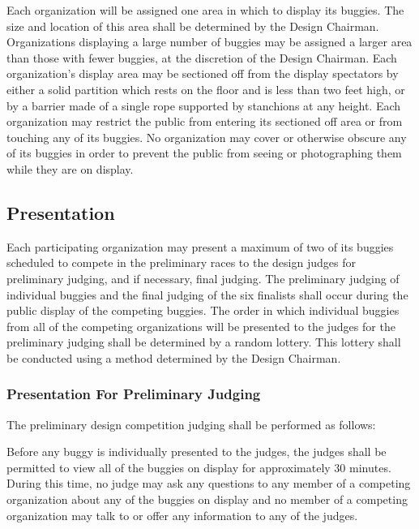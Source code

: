	Each organization will be assigned one area in which to display its buggies. The size and location of this area shall be determined by the Design Chairman. Organizations displaying a large number of buggies may be assigned a larger area than those with fewer buggies, at the discretion of the Design Chairman. Each organization's display area may be sectioned off from the display spectators by either a solid partition which rests on the floor and is less than two feet high, or by a barrier made of a single rope supported by stanchions at any height. Each organization may restrict the public from entering its sectioned off area or from touching any of its buggies. No organization may cover or otherwise obscure any of its buggies in order to prevent the public from seeing or photographing them while they are on display. 

\subsection{Presentation}

	Each participating organization may present a maximum of two of its buggies scheduled to compete in the preliminary races to the design judges for preliminary judging, and if necessary, final judging. The preliminary judging of individual buggies and the final judging of the six finalists shall occur during the public display of the competing buggies. The order in which individual buggies from all of the competing organizations will be presented to the judges for the preliminary judging shall be determined by a random lottery. This lottery shall be conducted using a method determined by the Design Chairman.

\subsubsection{Presentation For Preliminary Judging}

	The preliminary design competition judging shall be performed as follows: \newline
	
	Before any buggy is individually presented to the judges, the judges shall be permitted to view all of the buggies on display for approximately 30 minutes. During this time, no judge may ask any questions to any member of a competing organization about any of the buggies on display and no member of a competing organization may talk to or offer any information to any of the judges.

